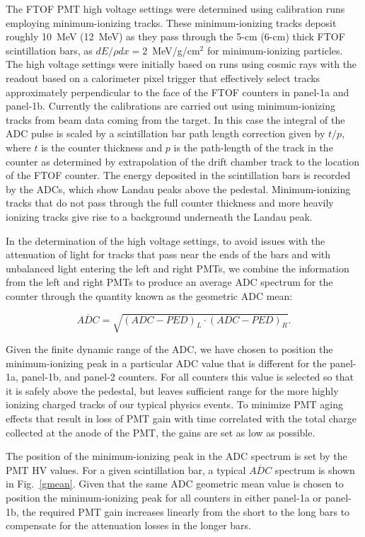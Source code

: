 \documentclass{elsart}
\begin{document}
The FTOF PMT high voltage settings were determined using calibration runs employing minimum-ionizing
tracks. These minimum-ionizing tracks deposit roughly 10~MeV (12~MeV) as they pass through the 5-cm
(6-cm) thick FTOF scintillation bars, as $dE/\rho dx = 2$~MeV/g/cm$^2$ for minimum-ionizing particles.
The high voltage settings were initially based on runs using cosmic rays with the readout based on a
calorimeter pixel trigger that effectively select tracks approximately perpendicular to the face of the
FTOF counters in panel-1a and panel-1b. Currently the calibrations are carried out using minimum-ionizing
tracks from beam data coming from the target. In this case the integral of the ADC pulse is scaled by a
scintillation bar path length correction given by $t/p$, where $t$ is the counter thickness and $p$ is the
path-length of the track in the counter as determined by extrapolation of the drift chamber track to the
location of the FTOF counter. The energy deposited in the scintillation bars is recorded by the ADCs, which
show Landau peaks above the pedestal. Minimum-ionizing tracks that do not pass through the full counter
thickness and more heavily ionizing tracks give rise to a background underneath the Landau peak.

In the determination of the high voltage settings, to avoid issues with the attenuation of light for tracks that
pass near the ends of the bars and with unbalanced light entering the left and right PMTs, we combine the
information from the left and right PMTs to produce an average ADC spectrum for the counter through the
quantity known as the geometric ADC mean:

\begin{equation}
\label{adc}
\overline{ADC} = \sqrt{ (ADC - PED)_L \cdot (ADC - PED)_R}.
\end{equation}

Given the finite dynamic range of the ADC, we have chosen to position the minimum-ionizing peak in a
particular ADC value that is different for the panel-1a, panel-1b, and panel-2 counters. For all counters
this value is selected so that it is safely above the pedestal, but leaves sufficient range for the more
highly ionizing charged tracks of our typical physics events. To minimize PMT aging effects that result in
loss of PMT gain with time correlated with the total charge collected at the anode of the PMT, the gains
are set as low as possible.

The position of the minimum-ionizing peak in the ADC spectrum is set by the PMT HV values. For a given
scintillation bar, a typical $\overline{ADC}$ spectrum is shown in Fig.~\ref{gmean}. Given that the same
ADC geometric mean value is chosen to position the minimum-ionizing peak for all counters in either
panel-1a or panel-1b, the required PMT gain increases linearly from the short to the long bars to compensate
for the attenuation losses in the longer bars.
\end{document}

